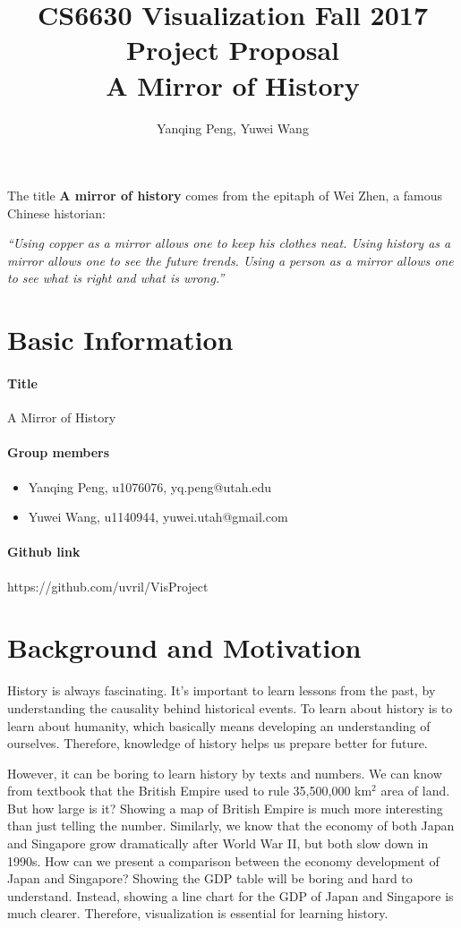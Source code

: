 \documentclass[12pt, fullpage,letterpaper]{article}
\title{CS6630 Visualization Fall 2017 Project Proposal\\ A Mirror of History}
\author{Yanqing Peng, Yuwei Wang}
\begin{document}
\maketitle

The title \textbf{A mirror of history} comes from the epitaph of Wei Zhen,
a famous Chinese historian:

\emph{``Using copper as a mirror allows one to keep his clothes neat. Using
history as a mirror allows one to see the future trends. Using a person as a
mirror allows one to see what is right and what is wrong.''}

\section{Basic Information}
\paragraph{Title} A Mirror of History
\paragraph{Group members}
\begin{itemize}
    \item Yanqing Peng, u1076076, yq.peng@utah.edu
    \item Yuwei Wang, u1140944, yuwei.utah@gmail.com
\end{itemize}
\paragraph{Github link} https://github.com/uvril/VisProject

\section{Background and Motivation}

History is always fascinating.  It's important to learn lessons from the past,
by understanding the causality behind historical events.  To learn about
history is to learn about humanity, which basically means developing an
understanding of ourselves.  Therefore, knowledge of history helps us prepare
better for future.

However, it can be boring to learn history by texts and numbers. We can know
from textbook that the British Empire used to rule 35,500,000 km$^2$ area of
land. But how large is it?  Showing a map of British Empire is much more
interesting than just telling the number.  Similarly, we know that the economy
of both Japan and Singapore grow dramatically after World War II, but both slow
down in 1990s.  How can we present a comparison between the economy development
of Japan and Singapore?  Showing the GDP table will be boring and hard to
understand.  Instead, showing a line chart for the GDP of Japan and Singapore
is much clearer. Therefore, visualization is essential for learning history.
\end{document}
